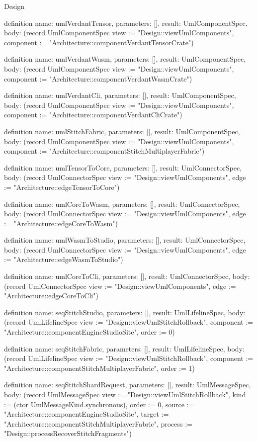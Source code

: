 \begin{lexlean}{Design}
\begin{semanticmodule}
definition{
  name: umlVerdantTensor,
  parameters: [],
  result: UmlComponentSpec,
  body: (record UmlComponentSpec {view := "Design::viewUmlComponents", component := "Architecture::componentVerdantTensorCrate"})
}

definition{
  name: umlVerdantWasm,
  parameters: [],
  result: UmlComponentSpec,
  body: (record UmlComponentSpec {view := "Design::viewUmlComponents", component := "Architecture::componentVerdantWasmCrate"})
}

definition{
  name: umlVerdantCli,
  parameters: [],
  result: UmlComponentSpec,
  body: (record UmlComponentSpec {view := "Design::viewUmlComponents", component := "Architecture::componentVerdantCliCrate"})
}

definition{
  name: umlStitchFabric,
  parameters: [],
  result: UmlComponentSpec,
  body: (record UmlComponentSpec {view := "Design::viewUmlComponents", component := "Architecture::componentStitchMultiplayerFabric"})
}

definition{
  name: umlTensorToCore,
  parameters: [],
  result: UmlConnectorSpec,
  body: (record UmlConnectorSpec {view := "Design::viewUmlComponents", edge := "Architecture::edgeTensorToCore"})
}

definition{
  name: umlCoreToWasm,
  parameters: [],
  result: UmlConnectorSpec,
  body: (record UmlConnectorSpec {view := "Design::viewUmlComponents", edge := "Architecture::edgeCoreToWasm"})
}

definition{
  name: umlWasmToStudio,
  parameters: [],
  result: UmlConnectorSpec,
  body: (record UmlConnectorSpec {view := "Design::viewUmlComponents", edge := "Architecture::edgeWasmToStudio"})
}

definition{
  name: umlCoreToCli,
  parameters: [],
  result: UmlConnectorSpec,
  body: (record UmlConnectorSpec {view := "Design::viewUmlComponents", edge := "Architecture::edgeCoreToCli"})
}

definition{
  name: seqStitchStudio,
  parameters: [],
  result: UmlLifelineSpec,
  body: (record UmlLifelineSpec {view := "Design::viewUmlStitchRollback", component := "Architecture::componentEngineStudioSite", order := 0})
}

definition{
  name: seqStitchFabric,
  parameters: [],
  result: UmlLifelineSpec,
  body: (record UmlLifelineSpec {view := "Design::viewUmlStitchRollback", component := "Architecture::componentStitchMultiplayerFabric", order := 1})
}

definition{
  name: seqStitchShardRequest,
  parameters: [],
  result: UmlMessageSpec,
  body: (record UmlMessageSpec {view := "Design::viewUmlStitchRollback", kind := (ctor UmlMessageKind.synchronous), order := 0, source := "Architecture::componentEngineStudioSite", target := "Architecture::componentStitchMultiplayerFabric", process := "Design::processRecoverStitchFragments"})
}


\end{semanticmodule}
\end{lexlean}
